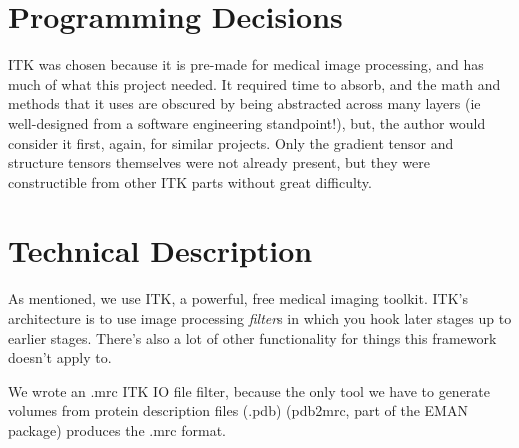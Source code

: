\documentclass{article}
\begin{document}


\section{Programming Decisions}

ITK \cite{itk} was chosen because it is pre-made for medical image
processing, and has much of what this project needed. It required time
to absorb, and the math and methods that it uses are obscured by being
abstracted across many layers (ie well-designed from a software
engineering standpoint!), but, the author would consider it first,
again, for similar projects. Only the gradient tensor and structure
tensors themselves were not already present, but they were
constructible from other ITK parts without great difficulty.


\section{Technical Description}

As mentioned, we use ITK, a powerful, free medical imaging toolkit.
ITK's architecture is to use image processing \emph{filter}s in which you hook
later stages up to earlier stages. There's also a lot of other functionality for things this framework doesn't apply to.

We wrote an .mrc ITK IO file filter, because the only tool we have to
generate volumes from protein description files (.pdb)
(pdb2mrc, part of the EMAN package)
produces the .mrc format.
\end{document}
